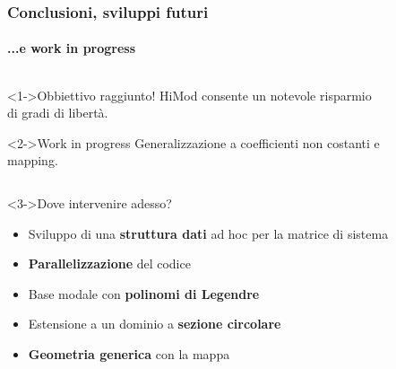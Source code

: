 \begin{frame}
 \frametitle{Conclusioni, sviluppi futuri}
 \framesubtitle{...e work in progress}
 \begin{columns}
  \begin{column}{0.5\textwidth}
    \begin{exampleblock}<1->{Obbiettivo raggiunto!}
    HiMod consente un notevole risparmio di gradi di libert\`a.
    \end{exampleblock}
    \begin{alertblock}<2->{Work in progress}
    Generalizzazione a coefficienti non costanti e mapping.
    \end{alertblock}
  \end{column}

  \begin{column}{0.5\textwidth}
   \begin{figure}
   \centering
    {}
   \end{figure}
  \end{column}
 \end{columns}
 
 \begin{block}<3->{Dove intervenire adesso?}
\begin{itemize}
\footnotesize	
    \item<4-> Sviluppo di una \textbf{struttura dati} ad hoc per la matrice di sistema
    \item<5-> \textbf{Parallelizzazione} del codice
    \item<6-> Base modale con \textbf{polinomi di Legendre}
    \item<7-> Estensione a un dominio a \textbf{sezione circolare}
    \item<8-> \textbf{Geometria generica} con la mappa
   \end{itemize}
   \end{block}
\end{frame}

